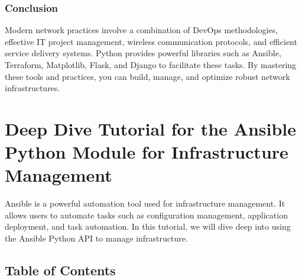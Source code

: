 \documentclass[
  letterpaper,
  DIV=11,
  numbers=noendperiod]{scrreprt}
\begin{document}
\subsection{Conclusion}\label{conclusion-39}

Modern network practices involve a combination of DevOps methodologies,
effective IT project management, wireless communication protocols, and
efficient service delivery systems. Python provides powerful libraries
such as Ansible, Terraform, Matplotlib, Flask, and Django to facilitate
these tasks. By mastering these tools and practices, you can build,
manage, and optimize robust network infrastructures.


\chapter{Deep Dive Tutorial for the Ansible Python Module for
Infrastructure
Management}\label{deep-dive-tutorial-for-the-ansible-python-module-for-infrastructure-management}

Ansible is a powerful automation tool used for infrastructure
management. It allows users to automate tasks such as configuration
management, application deployment, and task automation. In this
tutorial, we will dive deep into using the Ansible Python API to manage
infrastructure.

\section{Table of Contents}\label{table-of-contents-22}
\end{document}
